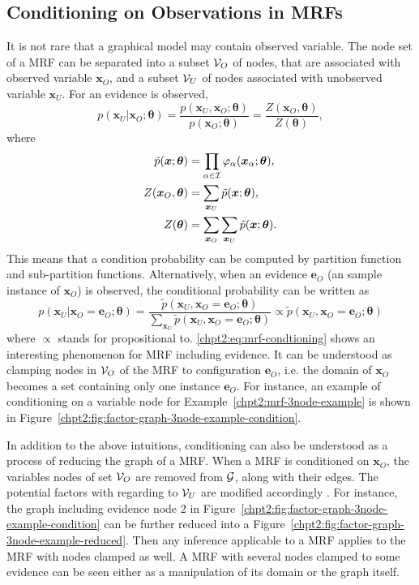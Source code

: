 \subsection{Conditioning on Observations in MRFs}
It is not rare that a graphical model may contain observed variable. The node set of a MRF can be separated into a subset $\mathcal{V}_O$ of nodes, that are associated with observed variable $\bm{x}_O$, and a subset $\mathcal{V}_U$ of nodes associated with unobserved variable $\bm{x}_U$. For an evidence is observed,
\begin{equation}
  p(\bm{x}_U|\bm{x}_O;\bm{\theta}) = \frac{p(\bm{x}_U, \bm{x}_O; \bm{\theta})}{p(\bm{x}_O;\bm{\theta})} =  \frac{Z(\bm{x}_O,\bm{\theta})}{Z(\bm{\theta})},
\end{equation}
where 
\begin{align}
  \tilde{p}(\bm{x}; \bm{\theta}) &= \prod_{\alpha \in \mathcal{I}} \varphi_{\alpha}(\bm{x}_{\alpha};\bm{\theta}), \nonumber \\
  Z(\bm{x}_O, \bm{\theta}) &= \sum_{\bm{x}_U} \tilde{p}(\bm{x}; \bm{\theta}), \nonumber \\
  Z(\bm{\theta}) &= \sum_{\bm{x}_O}\sum_{\bm{x}_U} \tilde{p}(\bm{x}; \bm{\theta}).
\end{align}
This means that a condition probability can be computed by partition function and sub-partition functions. Alternatively, when an evidence $\bm{e}_O$ (an sample instance of $\bm{x}_O$) is observed, the conditional probability can be written as
\begin{equation}\label{chpt2:eq:mrf-condtioning}
  p(\bm{x}_U|\bm{x}_O=\bm{e}_O;\bm{\theta}) = \frac{\tilde{p}(\bm{x}_U, \bm{x}_O = \bm{e}_O; \bm{\theta})}{\sum_{\bm{x}_U}\tilde{p}(\bm{x}_U, \bm{x}_O = \bm{e}_O; \bm{\theta})} \propto \tilde{p}(\bm{x}_U, \bm{x}_O = \bm{e}_O; \bm{\theta})
\end{equation}
where $\propto$ stands for propositional to. \ref{chpt2:eq:mrf-condtioning} shows an interesting phenomenon for MRF including evidence. It can be understood as clamping nodes in $\mathcal{V}_O$ of the MRF to configuration $\bm{e}_O$, i.e. the domain of $\bm{x}_O$ becomes a set containing only one instance $\bm{e}_O$. For instance, an example of conditioning on a variable node for Example~\ref{chpt2:mrf-3node-example} is shown in Figure~\ref{chpt2:fig:factor-graph-3node-example-condition}.



In addition to the above intuitions, conditioning can also be understood as a process of reducing the graph of a MRF. When a MRF is conditioned on $\bm{x}_O$, the variables nodes of set $\mathcal{V}_O$ are removed from $\mathcal{G}$, along with their edges. The potential factors with regarding to $\mathcal{V}_U$ are modified accordingly \cite[Chapter~4.2.3]{koller2009pgm}. For instance,
the graph including evidence node $2$ in Figure~\ref{chpt2:fig:factor-graph-3node-example-condition} can be further reduced into a Figure~\ref{chpt2:fig:factor-graph-3node-example-reduced}. Then any inference applicable to a MRF applies to the MRF with nodes clamped as well. A MRF with several nodes clamped to some evidence can be seen either as a manipulation of its domain or the graph itself.


